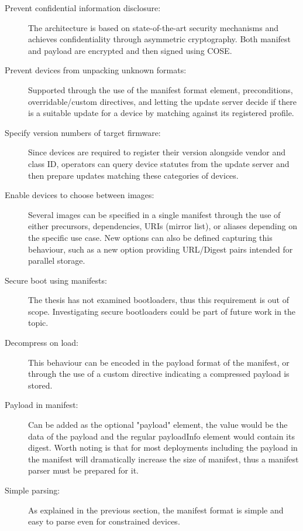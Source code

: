 \documentclass[0-thesis.tex]{subfiles}
\begin{document}
\begin{description}
    \item[Prevent confidential information disclosure:]
        The architecture is based on state-of-the-art security mechanisms and achieves
        confidentiality through asymmetric cryptography. Both manifest and payload are
        encrypted and then signed using COSE.

    \item[Prevent devices from unpacking unknown formats:]
        Supported through the use of the manifest format element, preconditions,
        overridable/custom directives, and letting the update server decide if there is a
        suitable update for a device by matching against its registered profile.

    \item[Specify version numbers of target firmware:]
        Since devices are required to register their version alongside vendor and class
        ID, operators can query device statutes from the update server and then prepare
        updates matching these categories of devices.

    \item[Enable devices to choose between images:]
        Several images can be specified in a single manifest through the use of either
        precursors, dependencies, URIs (mirror list), or aliases depending on the specific
        use case. New options can also be defined capturing this behaviour, such as a new
        option providing URL/Digest pairs intended for parallel storage.

    \item[Secure boot using manifests:]
        The thesis has not examined bootloaders, thus this requirement is out of scope.
        Investigating secure bootloaders could be part of future work in the topic.

    \item[Decompress on load:]
        This behaviour can be encoded in the payload format of the manifest, or through
        the use of a custom directive indicating a compressed payload is stored.

    \item[Payload in manifest:]
        Can be added as the optional "payload" element, the value would be the data of the
        payload and the regular payloadInfo element would contain its digest. Worth noting
        is that for most deployments including the payload in the manifest will
        dramatically increase the size of manifest, thus a manifest parser must be
        prepared for it.

    \item[Simple parsing:]
        As explained in the previous section, the manifest format is simple and easy to
        parse even for constrained devices.
\end{description}
\end{document}
